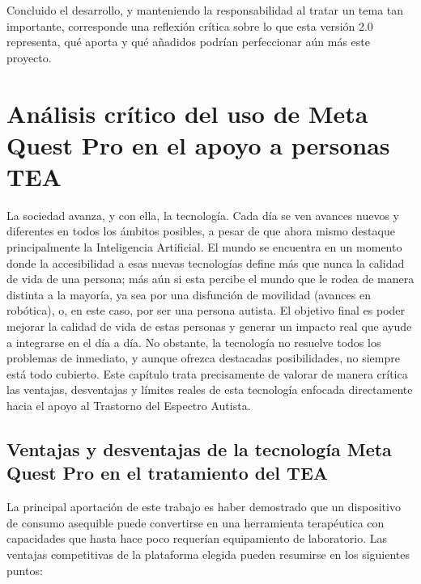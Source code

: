 \documentclass[12pt,twoside,titlepage]{report}
\begin{document}
Concluido el desarrollo, y manteniendo la responsabilidad al tratar un tema tan importante, corresponde una reflexión crítica sobre lo que esta versión 2.0 representa, qué aporta y qué añadidos podrían perfeccionar aún más este proyecto.

\section{Análisis crítico del uso de Meta Quest Pro en el apoyo a personas TEA}

La sociedad avanza, y con ella, la tecnología. Cada día se ven avances nuevos y diferentes en todos los ámbitos posibles, a pesar de que ahora mismo destaque principalmente la Inteligencia Artificial.
El mundo se encuentra en un momento donde la accesibilidad a esas nuevas tecnologías define más que nunca la calidad de vida de una persona; más aún si esta percibe el mundo que le rodea de manera distinta a la mayoría, ya sea por una disfunción de movilidad (avances en robótica), o, en este caso, por ser una persona autista.
El objetivo final es poder mejorar la calidad de vida de estas personas y generar un impacto real que ayude a integrarse en el día a día.
No obstante, la tecnología no resuelve todos los problemas de inmediato, y aunque ofrezca destacadas posibilidades, no siempre está todo cubierto.
Este capítulo trata precisamente de valorar de manera crítica las ventajas, desventajas y límites reales de esta tecnología enfocada directamente hacia el apoyo al Trastorno del Espectro Autista.

\subsection{Ventajas y desventajas de la tecnología Meta Quest Pro en el tratamiento del TEA}

La principal aportación de este trabajo es haber demostrado que un dispositivo de consumo asequible puede convertirse en una herramienta terapéutica con capacidades que hasta hace poco requerían equipamiento de laboratorio.
Las ventajas competitivas de la plataforma elegida pueden resumirse en los siguientes puntos:
\end{document}
